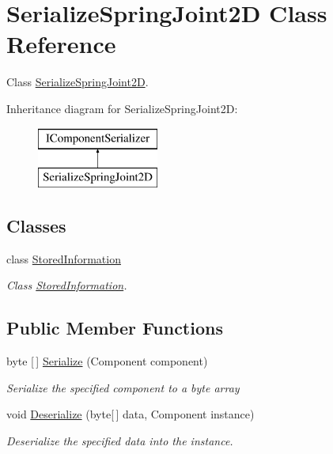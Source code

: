 \hypertarget{class_serialize_spring_joint2_d}{}\section{Serialize\+Spring\+Joint2D Class Reference}
\label{class_serialize_spring_joint2_d}


Class \hyperlink{class_serialize_spring_joint2_d}{Serialize\+Spring\+Joint2D}.  


Inheritance diagram for Serialize\+Spring\+Joint2D\+:\begin{figure}[H]
\begin{center}
\leavevmode
\includegraphics[height=2.000000cm]{class_serialize_spring_joint2_d}
\end{center}
\end{figure}
\subsection*{Classes}
\begin{DoxyCompactItemize}
\item 
class \hyperlink{class_serialize_spring_joint2_d_1_1_stored_information}{Stored\+Information}
\begin{DoxyCompactList}\small\item\em Class \hyperlink{class_serialize_spring_joint2_d_1_1_stored_information}{Stored\+Information}. \end{DoxyCompactList}\end{DoxyCompactItemize}
\subsection*{Public Member Functions}
\begin{DoxyCompactItemize}
\item 
byte \mbox{[}$\,$\mbox{]} \hyperlink{class_serialize_spring_joint2_d_a74dc25a62ade31ed51b3f47d1097e5e7}{Serialize} (Component component)
\begin{DoxyCompactList}\small\item\em Serialize the specified component to a byte array \end{DoxyCompactList}\item 
void \hyperlink{class_serialize_spring_joint2_d_aac148dbf74d0b00fff9983e677ed4a10}{Deserialize} (byte\mbox{[}$\,$\mbox{]} data, Component instance)
\begin{DoxyCompactList}\small\item\em Deserialize the specified data into the instance. \end{DoxyCompactList}\end{DoxyCompactItemize}


